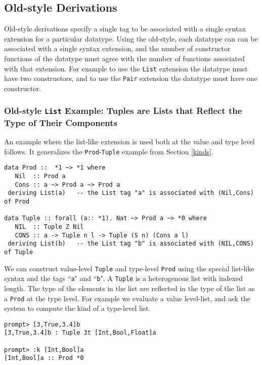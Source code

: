 \documentclass[11pt,twoside]{article}
\begin{document}
\subsection{Old-style Derivations}

Old-style derivations specify a single tag to be associated with a single syntax
extension for a particular datatype. Using the old-style, each datatype can can be associated with a
single syntax extension, and the number of constructor functions of the datatype
must agree with the number of functions associated with that extension. For example
to use the {\tt List} extension the datatype must have two constructors, and to use
the {\tt Pair} extension the datatype must have one constructor.


\subsubsection{Old-style {\tt List} Example: Tuples are Lists that Reflect the Type of Their Components}

An example where the
list-like extension is used both at the value and type level follows.
It generalizes the {\tt Prod}-{\tt Tuple} example from Section \ref{kinds}.



\begin{verbatim}
data Prod ::  *1 ~> *1 where
   Nil  :: Prod a
   Cons :: a ~> Prod a ~> Prod a
 deriving List(a)   -- the List tag "a" is associated with (Nil,Cons) of Prod

data Tuple :: forall (a:: *1). Nat ~> Prod a ~> *0 where
   NIL  :: Tuple Z Nil
   CONS :: a -> Tuple n l -> Tuple (S n) (Cons a l)
 deriving List(b)   -- the List tag "b" is associated with (NIL,CONS) of Tuple
\end{verbatim}
We can construct value-level {\tt Tuple} and type-level {\tt Prod} using
the special list-like syntax and the tags ``{\tt a}" and ``{\tt b}". A {\tt Tuple}
is a heterogenous list with indexed length. The type of the elements in
the list are reflected in the type of the list as a {\tt Prod} at the type
level. For example we evaluate a value level-list, and ask the system
to compute the kind of a type-level list.

\begin{verbatim}
prompt> [3,True,3.4]b
[3,True,3.4]b : Tuple 3t [Int,Bool,Float]a

prompt> :k [Int,Bool]a
[Int,Bool]a :: Prod *0
\end{verbatim}
\end{document}
